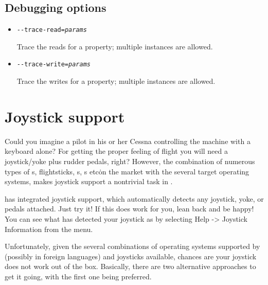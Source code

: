 \subsection{Debugging options}
\begin{itemize}
\item{\texttt{-$ $-trace-read={\it params}}}

  Trace the reads for a property; multiple instances are allowed.

\item{\texttt{-$ $-trace-write={\it params}}}

  Trace the writes for a property; multiple instances are allowed.
\end{itemize}



\section{Joystick support\label{joysticksupp}}
Could you imagine a pilot in his or her Cessna controlling the machine with
a keyboard alone? For getting the proper feeling of flight you will need a
joystick/yoke plus rudder pedals, right? However, the combination of
numerous types of s, flightsticks, s,
s etc\. on the market with the several target operating systems,
makes joystick support a nontrivial task in \FlightGear{}.

\FlightGear{} has integrated joystick support, which automatically detects 
any joystick, yoke, or pedals attached. Just try it! If this does work for 
you, lean back and be happy! You can see what \FlightGear{} has detected your
joystick as by selecting Help -> Joystick Information from the menu.

Unfortunately, given the several combinations of operating systems supported
by \FlightGear{} (possibly in foreign languages) and joysticks available,
chances are your joystick does not work out of the box. Basically, there are
two alternative approaches to get it going, with the first one being
preferred.


